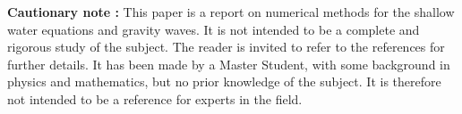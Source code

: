 \documentclass[11pt,a4paper]{report}
\begin{document}
\begin{titlepage}
\begin{center}
        \begin{minipage}{14cm}
            \small{
                \textbf{Cautionary note : } This paper is a report on numerical methods for the shallow water equations and gravity waves. It is not intended to be a complete and rigorous study of the subject. The reader is invited to refer to the references for further details.
                It has been made by a Master Student, with some background in physics and mathematics, but no prior knowledge of the subject. It is therefore not intended to be a reference for experts in the field.}
        \end{minipage}

    \end{center}

\end{titlepage}

\newpage
\tableofcontents
\newpage
\end{document}
